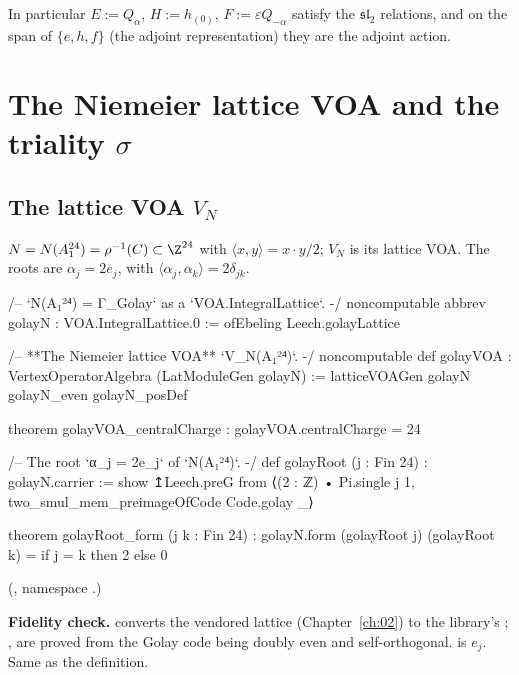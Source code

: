 In particular $E:=Q_\alpha$, $H:=h_{(0)}$, $F:=\varepsilon Q_{-\alpha}$ satisfy the $\mathfrak{sl}_2$
relations, and on the span of $\{e,h,f\}$ (the adjoint representation) they are the adjoint action.

\section{The Niemeier lattice VOA and the triality \texorpdfstring{$\sigma$}{sigma}}\label{ch11:sec:triality}

\subsection{The lattice VOA \texorpdfstring{$V_N$}{V\_N}}

\begin{definition}[$V_N$]\label{ch11:def:golayVOA}
$N=N(A_1^{24})=\rho^{-1}(C)\subset\Z^{24}$ with $\langle x,y\rangle=x\cdot y/2$; $V_N$ is its lattice VOA.
The roots are $\alpha_j=2e_j$, with $\langle\alpha_j,\alpha_k\rangle=2\delta_{jk}$.
\end{definition}
\begin{leancode}
/-- `N(A₁²⁴) = Γ_Golay` as a `VOA.IntegralLattice`. -/
noncomputable abbrev golayN : VOA.IntegralLattice.{0} := ofEbeling Leech.golayLattice

/-- **The Niemeier lattice VOA** `V_{N(A₁²⁴)}`. -/
noncomputable def golayVOA : VertexOperatorAlgebra (LatModuleGen golayN) :=
  latticeVOAGen golayN golayN_even golayN_posDef

theorem golayVOA_centralCharge : golayVOA.centralCharge = 24

/-- The root `α_j = 2e_j` of `N(A₁²⁴)`. -/
def golayRoot (j : Fin 24) : golayN.carrier :=
  show ↥Leech.preG from ⟨(2 : ℤ) • Pi.single j 1, two_smul_mem_preimageOfCode Code.golay _⟩

theorem golayRoot_form (j k : Fin 24) :
    golayN.form (golayRoot j) (golayRoot k) = if j = k then 2 else 0
\end{leancode}
(, namespace .)
\begin{dictionary}
\textbf{Fidelity check.}   converts the vendored lattice (Chapter~\ref{ch:02}) to the
library's ; ,  are proved from the Golay
code being doubly even and self-orthogonal.   is $e_j$.  Same as the definition.
\end{dictionary}

